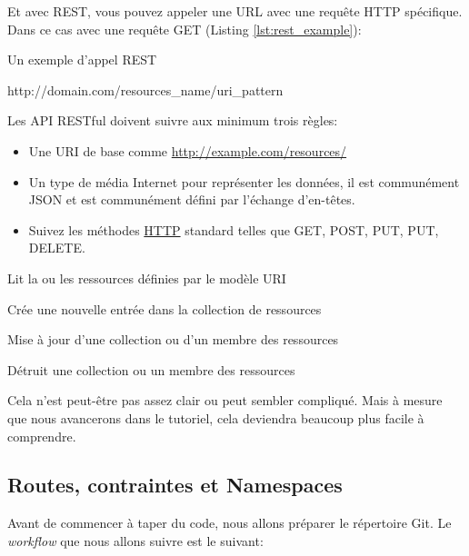 \documentclass[]{report}
\begin{document}
    Et avec REST, vous pouvez appeler une URL avec une requête HTTP spécifique. Dans ce cas avec une requête GET (Listing \ref{lst:rest_example}):

    \begin{listing}
      \label{lst:rest_example}
      \caption{Un exemple d'appel REST}
      \begin{bashcode}
      http://domain.com/resources_name/uri_pattern
      \end{bashcode}
    \end{listing}

    Les API RESTful doivent suivre aux minimum trois règles:

    \begin{itemize}
      \item Une URI de base comme \href{http://example.com/resources/}{http://example.com/resources/}
      \item Un type de média Internet pour représenter les données, il est communément JSON et est communément défini par l'échange d'en-têtes.
      \item Suivez les méthodes \href{https://fr.wikipedia.org/wiki/Hypertext_Transfer_Protocol}{HTTP} standard telles que GET, POST, PUT, PUT, DELETE.
    \end{itemize}

    \begin{description}\label{desc:http_verbs}
      \item[GET] Lit la ou les ressources définies par le modèle URI
      \item[POST] Crée une nouvelle entrée dans la collection de ressources
      \item[PUT] Mise à jour d'une collection ou d'un membre des ressources
      \item[DELETE] Détruit une collection ou un membre des ressources
    \end{description}

    Cela n'est peut-être pas assez clair ou peut sembler compliqué. Mais à mesure que nous avancerons dans le tutoriel, cela deviendra beaucoup plus facile à comprendre.

    \subsection{Routes, contraintes et Namespaces}\label{subsec:routes_constraints_namespaces}

      Avant de commencer à taper du code, nous allons préparer le répertoire Git. Le \textit{workflow} que nous allons suivre est le suivant:
\end{document}
